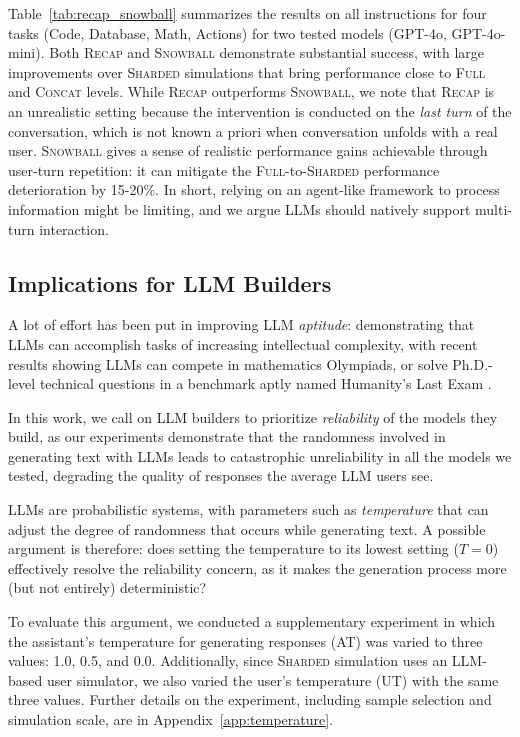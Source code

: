 \documentclass{article}
\newcommand{\fullt}{\textsc{Full}\xspace}
\newcommand{\concatt}{\textsc{Concat}\xspace}
\newcommand{\shardedt}{\textsc{Sharded}\xspace}
\newcommand{\snowballt}{\textsc{Snowball}\xspace}
\newcommand{\recapt}{\textsc{Recap}\xspace}
\begin{document}
Table~\ref{tab:recap_snowball} summarizes the results on all instructions for four tasks (Code, Database, Math, Actions) for two tested models (GPT-4o, GPT-4o-mini). Both \recapt and \snowballt demonstrate substantial success, with large improvements over \shardedt simulations that bring performance close to \fullt and \concatt levels. While \recapt outperforms \snowballt, we note that \recapt is an unrealistic setting because the intervention is conducted on the \textit{last turn} of the conversation, which is not known a priori when conversation unfolds with a real user. \snowballt gives a sense of realistic performance gains achievable through user-turn repetition: it can mitigate the \fullt-to-\shardedt performance deterioration by 15-20\%. In short, relying on an agent-like framework to process information might be limiting, and we argue LLMs should natively support multi-turn interaction.

\subsection{Implications for LLM Builders} \label{sec:implications_llms}

A lot of effort has been put in improving LLM \textit{aptitude}: demonstrating that LLMs can accomplish tasks of increasing intellectual complexity, with recent results showing LLMs can compete in mathematics Olympiads, or solve Ph.D.-level technical questions in a benchmark aptly named Humanity's Last Exam \cite{phan2025humanity}.

In this work, we call on LLM builders to prioritize \textit{reliability} of the models they build, as our experiments demonstrate that the randomness involved in generating text with LLMs leads to catastrophic unreliability in all the models we tested, degrading the quality of responses the average LLM users see.

LLMs are probabilistic systems, with parameters such as \textit{temperature} that can adjust the degree of randomness that occurs while generating text. A possible argument is therefore: does setting the temperature to its lowest setting ($T=0$) effectively resolve the reliability concern, as it makes the generation process more (but not entirely) deterministic?

To evaluate this argument, we conducted a supplementary experiment in which the assistant's temperature for generating responses (AT) was varied to three values: 1.0, 0.5, and 0.0. Additionally, since \shardedt simulation uses an LLM-based user simulator, we also varied the user's temperature (UT) with the same three values. Further details on the experiment, including sample selection and simulation scale, are in Appendix~\ref{app:temperature}.
\end{document}
